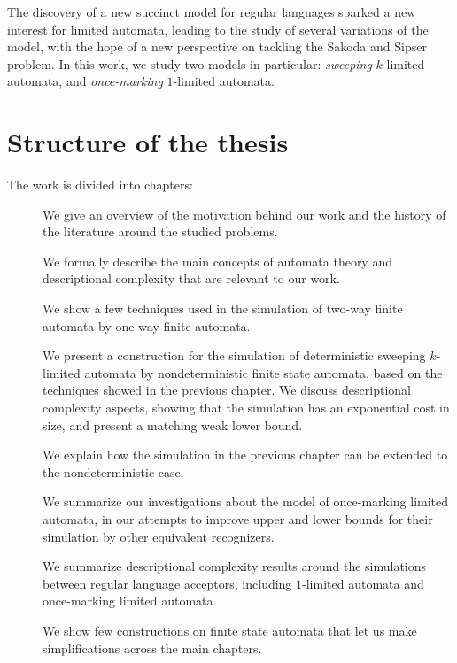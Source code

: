 The discovery of a new succinct model for regular languages sparked a new interest for limited automata, leading to the study of several variations of the model, with the hope of a new perspective on tackling the Sakoda and Sipser problem.
In this work, we study two models in particular: \emph{sweeping} $k$-limited automata, and \emph{once-marking} $1$-limited automata.



\section{Structure of the thesis}
The work is divided into chapters:
\begin{description}
	\item[] We give an overview of the motivation behind our work and the history of the literature around the studied problems.
	\item[] We formally describe the main concepts of automata theory and descriptional complexity that are relevant to our work.
	\item[] We show a few techniques used in the simulation of two-way finite automata by one-way finite automata.
	\item[] We present a construction for the simulation of deterministic sweeping $k$-limited automata by nondeterministic finite state automata, based on the techniques showed in the previous chapter. We discuss descriptional complexity aspects, showing that the simulation has an exponential cost in size, and present a matching weak lower bound.
	\item[] We explain how the simulation in the previous chapter can be extended to the nondeterministic case.
	\item[] We summarize our investigations about the model of once-marking limited automata, in our attempts to improve upper and lower bounds for their simulation by other equivalent recognizers.
	\item[] We summarize descriptional complexity results around the simulations between regular language acceptors, including $1$-limited automata and once-marking limited automata.
	\item[] We show few constructions on finite state automata that let us make simplifications across the main chapters.
\end{description}
